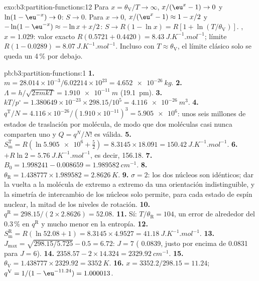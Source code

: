 \begin{solution}{exo:b3:partition-functions:12}
Para $x = \theta_{\mathrm V}/T \to \infty$, $x/(\eu^x - 1) \to 0$ y $\ln(1 - \eu^{-x}) \to 0$: $S \to 0$. Para $x \to 0$,
$x/(\eu^x - 1) \approx 1 - x/2$ y $-\ln(1 - \eu^{-x}) \approx -\ln x + x/2$: $S \to R(1 - \ln x) = R[1 + \ln(T/\theta_{\mathrm V})]$.
, $x = 1.029$: valor exacto $R(0.5721 + 0.4420) = \qty{8.43}{J.K^{-1}.mol^{-1}}$; límite $R(1 - 0.0289) =
\qty{8.07}{J.K^{-1}.mol^{-1}}$. Incluso con $T \approx \theta_{\mathrm V}$, el límite clásico solo se queda un 4\,\% por debajo.
\end{solution}

\begin{solution}{pb:b3:partition-functions:1}
\textbf{1.} $m = 28.014\times10^{-3}/6.02214\times10^{23} = \qty{4.652e-26}{kg}$.
\textbf{2.} $\Lambda = h/\sqrt{2\pi mkT} = \qty{1.910e-11}{m}$ (\qty{19.1}{pm}).
\textbf{3.} $kT/p^\circ = 1.380649\times10^{-23} \times 298.15/10^5 = \qty{4.116e-26}{m^3}$.
\textbf{4.} $q^{\mathrm T}/N = 4.116\times10^{-26}/(1.910\times10^{-11})^3 = \num{5.905e6}$: unos seis millones
de estados de traslación por molécula, de modo que dos moléculas casi nunca comparten uno y
$Q = q^N/N!$ es válida.
\textbf{5.} $S^{\mathrm T}_{\mathrm m} = R(\ln\num{5.905e6} + \frac52) = 8.3145 \times 18.091 = \qty{150.42}{J.K^{-1}.mol^{-1}}$.
\textbf{6.} $+R\ln2 = \qty{5.76}{J.K^{-1}.mol^{-1}}$, es decir, \num{156.18}.
\textbf{7.} $B_0 = 1.998241 - 0.008659 = \qty{1.989582}{cm^{-1}}$.
\textbf{8.} $\theta_{\mathrm R} = 1.438777 \times 1.989582 = \qty{2.8626}{K}$.
\textbf{9.} $\sigma = 2$: los dos núcleos son idénticos; dar la vuelta a la molécula de extremo a extremo
da una orientación indistinguible, y la simetría de intercambio de los
núcleos solo permite, para cada estado de espín nuclear, la mitad de los niveles de rotación.
\textbf{10.} $q^{\mathrm R} = 298.15/(2 \times 2.8626) = 52.08$.
\textbf{11.} Sí: $T/\theta_{\mathrm R} = 104$, un error de alrededor del 0.3\,\% en $q^{\mathrm R}$ y mucho menor en la
entropía.
\textbf{12.} $S^{\mathrm R}_{\mathrm m} = R(\ln52.08 + 1) = 8.3145 \times 4.9527 = \qty{41.18}{J.K^{-1}.mol^{-1}}$.
\textbf{13.} $J_{\max} = \sqrt{298.15/5.725} - 0.5 = 6.72$: $J = 7$ ( 0.0839, justo por encima de
0.0831 para $J = 6$).
\textbf{14.} $2358.57 - 2 \times 14.324 = \qty{2329.92}{cm^{-1}}$.
\textbf{15.} $\theta_{\mathrm V} = 1.438777 \times 2329.92 = \qty{3352}{K}$.
\textbf{16.} $x = 3352.2/298.15 = 11.24$; $q^{\mathrm V} = 1/(1 - \eu^{-11.24}) = 1.000013$.

\end{solution}
